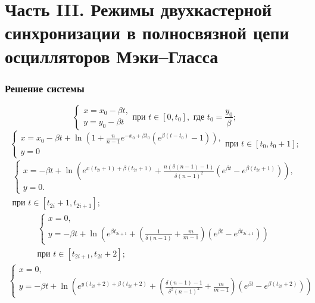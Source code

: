 \section{Часть III. Режимы двухкастерной синхронизации в полносвязной цепи осцилляторов Мэки--Гласса}
\begin{frame}[allowframebreaks]
	\frametitle{Решение системы}
	\footnotesize
	\begin{equation*}
		\begin{cases}
			x = x_0 - \beta t,\\
			y = y_0 - \beta t
		\end{cases}
		\text{при } t \in [0, t_0], \text{ где } t_0 = \dfrac{y_0}{\beta};
	\end{equation*}
	\begin{equation*}
		\begin{cases}
			x = x_0 - \beta t + \ln\left(1 + \frac{n}{n - 1} e^{-x_0 + \beta t_0}  (e^{\beta  (t - t_0)} - 1)\right),\\
			y = 0
		\end{cases}
		\text{при } t \in [t_0, t_0 + 1];
	\end{equation*}
	\begin{multline*}
		\begin{cases}
			x = -\beta t + \ln\left(e^{x(t_{2i} + 1) + \beta (t_{2i} + 1)} + \frac{n (\delta(n - 1) - 1)}{\delta (n - 1)^2} (e^{\beta t} - e^{\beta (t_{2i} + 1)})\right)
			,\\
			y = 0.
		\end{cases}\\
		\text{при } t \in [t_{2i} + 1, t_{2i + 1}];
	\end{multline*}
	\begin{multline*}
		\begin{cases}
			x = 0,\\
			y = -\beta t + \ln\left(e^{\beta t_{2i + 1}} + \left(\frac{1}{\delta(n - 1)} + \frac{m}{m - 1}\right) (e^{\beta t} - e^{\beta t_{2i + 1}})\right)
		\end{cases}\\
		\text{при } t \in [t_{2i + 1}, t_{2i} + 2];
	\end{multline*}
	\begin{multline*}
		\begin{cases}
			x = 0,\\
			y = -\beta t + \ln\left(e^{y(t_{2i} + 2) + \beta (t_{2i} + 2)} + \left(\frac{\delta(n - 1) - 1}{\delta^2 (n - 1)^2} + \frac{m}{m - 1}\right) (e^{\beta t} - e^{\beta (t_{2i} + 2)})\right)
		\end{cases}\\

\end{multline*}
\end{frame}
